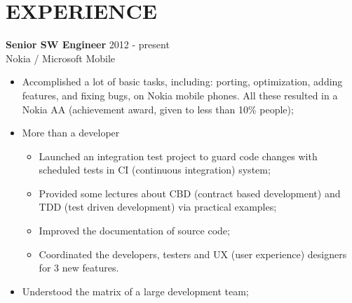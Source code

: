 
\section{EXPERIENCE}
\textbf{Senior SW Engineer} \hfill 2012 - present\\
        Nokia / Microsoft Mobile
        \begin{itemize}  \itemsep -2pt %
        \item Accomplished a lot of basic tasks, including:
        porting, optimization, adding features, and fixing bugs,
        on Nokia mobile phones.
        All these resulted in a Nokia AA (achievement award, given to less than 10\% people);
        \item More than a developer 
            \begin{itemize}  \itemsep -2pt
                \item Launched an integration test project to guard code changes
                with scheduled tests in CI (continuous integration) system;
                \item Provided some lectures about CBD (contract based development) and
                TDD (test driven development) via practical examples;
                \item Improved the documentation of source code;
                \item Coordinated the developers, testers and UX (user experience) designers for 3 new features.
            \end{itemize}
        \item Understood the matrix of a large development team;
        \end{itemize}

